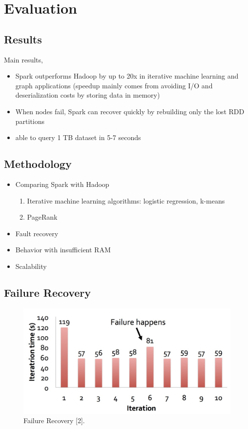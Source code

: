 \section{Evaluation}
\subsection{Results}
\begin{frame}
Main results,
\begin{itemize}
  \item Spark outperforms Hadoop by up to 20x in iterative machine learning and
  graph applications (speedup mainly comes from avoiding I/O and
  deserialization costs by storing data in memory)
  \item When nodes fail, Spark can recover quickly by rebuilding only the lost
  RDD partitions
  \item able to query 1 TB dataset in 5-7 seconds
\end{itemize}
\end{frame}

\subsection{Methodology}
\begin{frame}
\begin{itemize}
  \item Comparing Spark with Hadoop
	\begin{enumerate}
	  \item Iterative machine learning algorithms: logistic regression, k-means
	  \item PageRank
	\end{enumerate}
  \item Fault recovery
  \item Behavior with insufficient RAM
  \item Scalability
\end{itemize}
\end{frame}

\subsection{Failure Recovery}
\begin{frame}
\begin{figure}
\centering
\includegraphics[width=0.80\linewidth]{figures/results-failure-recovery.jpg}
\caption{Failure Recovery [2].}
\end{figure}
\end{frame}

